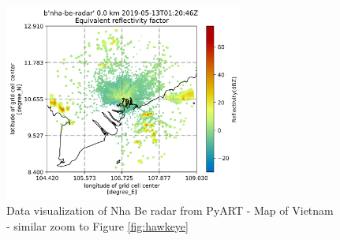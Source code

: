 \begin{figure}[H]
  \centering
  \includegraphics[width=0.7\textwidth]{Images/3.1-201905130120.DBZ-pyart.png}
  \vspace{2em}
  \caption{Data visualization of Nha Be radar from PyART - Map of Vietnam - similar zoom to Figure \ref{fig:hawkeye}}
  \label{fig:nha-be-viz-far}
\end{figure}

